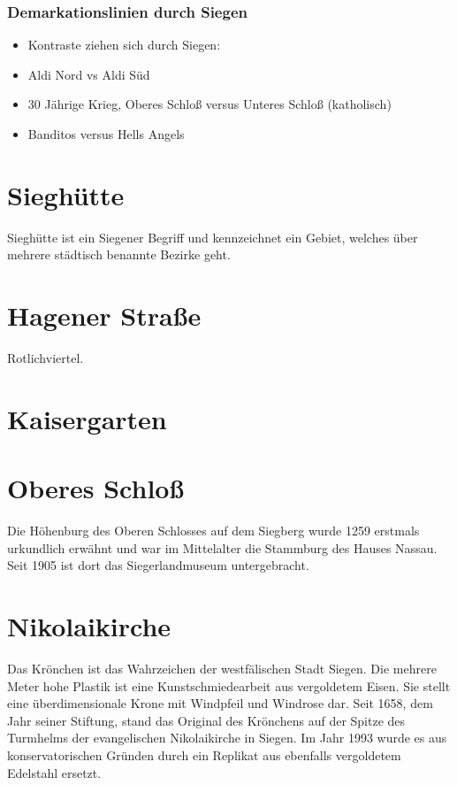 \documentclass[paper=a4, fontsize=11pt]{scrartcl} %
\numberwithin{equation}{section}		%
\numberwithin{figure}{section}			%
\numberwithin{table}{section}			%
\begin{document}
 \subsubsection{Demarkationslinien durch Siegen}
 \begin{itemize}\setlength\itemsep{0pt}
 	\item Kontraste ziehen sich durch Siegen: 
 	\item Aldi Nord vs Aldi Süd
 	\item 30 Jährige Krieg, Oberes Schloß versus Unteres Schloß (katholisch)
 	\item Banditos versus Hells Angels
 \end{itemize}

\section{Sieghütte} 
Sieghütte ist ein Siegener Begriff und kennzeichnet ein Gebiet, welches über mehrere städtisch benannte Bezirke geht. 

\section{Hagener Straße}
Rotlichviertel. 

\section{Kaisergarten}

\section{Oberes Schloß}
Die Höhenburg des Oberen Schlosses auf dem Siegberg wurde 1259 erstmals urkundlich erwähnt und war im Mittelalter die Stammburg des Hauses Nassau. Seit 1905 ist dort das Siegerlandmuseum untergebracht.

\section{Nikolaikirche}
Das Krönchen ist das Wahrzeichen der westfälischen Stadt Siegen. Die mehrere Meter hohe Plastik ist eine Kunstschmiedearbeit aus vergoldetem Eisen. Sie stellt eine überdimensionale Krone mit Windpfeil und Windrose dar. Seit 1658, dem Jahr seiner Stiftung, stand das Original des Krönchens auf der Spitze des Turmhelms der evangelischen Nikolaikirche in Siegen. Im Jahr 1993 wurde es aus konservatorischen Gründen durch ein Replikat aus ebenfalls vergoldetem Edelstahl ersetzt.\par
\end{document}
